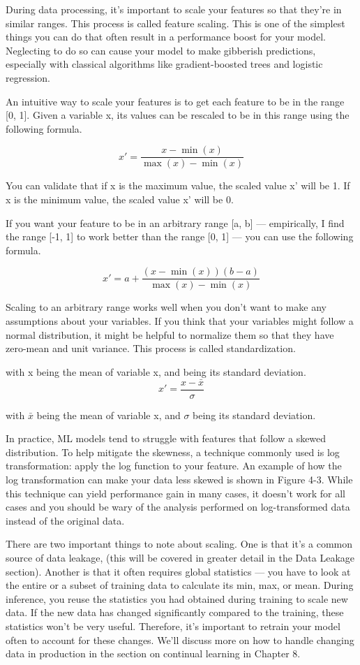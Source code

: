 \documentclass[openany]{book}
\begin{document}
During data processing, it’s important to scale your features so that they’re in similar ranges. This process is called feature scaling. This is one of the simplest things you can do that often result in a performance boost for your model. Neglecting to do so can cause your model to make gibberish predictions, especially with classical algorithms like gradient-boosted trees and logistic regression.

An intuitive way to scale your features is to get each feature to be in the range [0, 1]. Given a variable x, its values can be rescaled to be in this range using the following formula.

$$x' = \frac{x - \min(x)}{\max(x) - \min(x)}$$

You can validate that if x is the maximum value, the scaled value x’ will be 1. If x is the minimum value, the scaled value x’ will be 0.

If you want your feature to be in an arbitrary range [a, b] — empirically, I find the range [-1, 1] to work better than the range [0, 1] — you can use the following formula.

$$x' = a + \frac{(x - \min(x))(b - a)}{\max(x) - \min(x)}$$

Scaling to an arbitrary range works well when you don’t want to make any assumptions about your variables. If you think that your variables might follow a normal distribution, it might be helpful to normalize them so that they have zero-mean and unit variance. This process is called standardization.

with x being the mean of variable x, and  being its standard deviation.
$$x' = \frac{x - \bar{x}}{\sigma}$$

with $\bar{x}$ being the mean of variable x, and $\sigma$ being its standard deviation.

In practice, ML models tend to struggle with features that follow a skewed distribution. To help mitigate the skewness, a technique commonly used is log transformation: apply the log function to your feature. An example of how the log transformation can make your data less skewed is shown in Figure 4-3. While this technique can yield performance gain in many cases, it doesn’t work for all cases and you should be wary of the analysis performed on log-transformed data instead of the original data.

There are two important things to note about scaling. One is that it’s a common source of data leakage, (this will be covered in greater detail in the Data Leakage section). Another is that it often requires global statistics — you have to look at the entire or a subset of training data to calculate its min, max, or mean. During inference, you reuse the statistics you had obtained during training to scale new data. If the new data has changed significantly compared to the training, these statistics won’t be very useful. Therefore, it’s important to retrain your model often to account for these changes. We’ll discuss more on how to handle changing data in production in the section on continual learning in Chapter 8.
\end{document}
